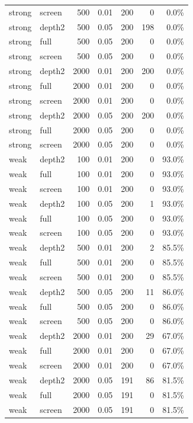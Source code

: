 \begin{longtable}{llrrrrr}
strong & screen & 500 & 0.01 & 200 & 0 & 0.0\%\\
strong & depth2 & 500 & 0.05 & 200 & 198 & 0.0\%\\
strong & full & 500 & 0.05 & 200 & 0 & 0.0\%\\
strong & screen & 500 & 0.05 & 200 & 0 & 0.0\%\\
strong & depth2 & 2000 & 0.01 & 200 & 200 & 0.0\%\\
strong & full & 2000 & 0.01 & 200 & 0 & 0.0\%\\
strong & screen & 2000 & 0.01 & 200 & 0 & 0.0\%\\
strong & depth2 & 2000 & 0.05 & 200 & 200 & 0.0\%\\
strong & full & 2000 & 0.05 & 200 & 0 & 0.0\%\\
strong & screen & 2000 & 0.05 & 200 & 0 & 0.0\%\\
weak & depth2 & 100 & 0.01 & 200 & 0 & 93.0\%\\
weak & full & 100 & 0.01 & 200 & 0 & 93.0\%\\
weak & screen & 100 & 0.01 & 200 & 0 & 93.0\%\\
weak & depth2 & 100 & 0.05 & 200 & 1 & 93.0\%\\
weak & full & 100 & 0.05 & 200 & 0 & 93.0\%\\
weak & screen & 100 & 0.05 & 200 & 0 & 93.0\%\\
weak & depth2 & 500 & 0.01 & 200 & 2 & 85.5\%\\
weak & full & 500 & 0.01 & 200 & 0 & 85.5\%\\
weak & screen & 500 & 0.01 & 200 & 0 & 85.5\%\\
weak & depth2 & 500 & 0.05 & 200 & 11 & 86.0\%\\
weak & full & 500 & 0.05 & 200 & 0 & 86.0\%\\
weak & screen & 500 & 0.05 & 200 & 0 & 86.0\%\\
weak & depth2 & 2000 & 0.01 & 200 & 29 & 67.0\%\\
weak & full & 2000 & 0.01 & 200 & 0 & 67.0\%\\
weak & screen & 2000 & 0.01 & 200 & 0 & 67.0\%\\
weak & depth2 & 2000 & 0.05 & 191 & 86 & 81.5\%\\
weak & full & 2000 & 0.05 & 191 & 0 & 81.5\%\\
weak & screen & 2000 & 0.05 & 191 & 0 & 81.5\%\\
\bottomrule\end{longtable}

\endgroup

